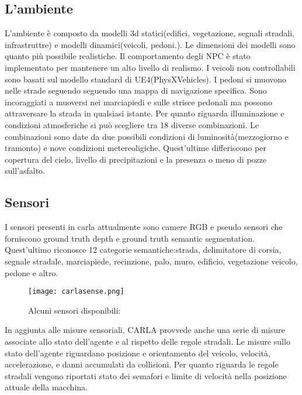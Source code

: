 \subsection{L'ambiente}
L'ambiente è composto da modelli 3d statici(edifici, vegetazione, segnali stradali, infrastruttre) e modelli dinamici(veicoli, pedoni.). Le dimensioni 
dei modelli sono quanto più possibile realistiche.  Il comportamento degli NPC è stato implementato per mantenere un alto livello di realismo. I veicoli non controllabili
sono basati sul modello standard di UE4(PhysXVehicles). I pedoni si muovono nelle strade seguendo seguendo una mappa di navigazione specifica. Sono incoraggiati a muoversi nei 
marciapiedi e sulle strisce pedonali ma possono attraversare la strada in qualsiasi istante. Per quanto riguarda illuminazione e condizioni atmosferiche si può scegliere tra 18 diverse combinazioni.
Le combinazioni sono date da due possibili condizioni di luminosità(mezzogiorno e tramonto) e nove condizioni metereoligiche. Quest'ultime differiscono per copertura del cielo,
livello di precipitazioni e la presenza o meno di pozze sull'asfalto.
\subsection{Sensori}
I sensori presenti in carla attualmente sono camere RGB e pseudo sensori che forniscono ground truth depth e ground truth semantic segmentation.
Quest'ultimo riconosce 12 categorie semantiche:strada, delimitatore di corsia, segnale stradale, marciapiede, recinzione, palo, muro, edificio, vegetazione
veicolo, pedone e altro.
\begin{figure}[h]
    \texttt{[image: carlasense.png]}
    \caption{Alcuni sensori disponibili:}
    \label{fig:sense}
\end{figure}
In aggiunta alle misure sensoriali, CARLA provvede anche una serie di misure associate allo stato dell'agente e al rispetto delle regole stradali. Le misure 
sullo stato dell'agente riguardano posizione e orientamento del veicolo, velocità, accelerazione, e danni accumulati da collisioni. Per quanto riguarda le regole
stradali vengono riportati stato dei semafori e limite di velocità nella posizione attuale della macchina.
